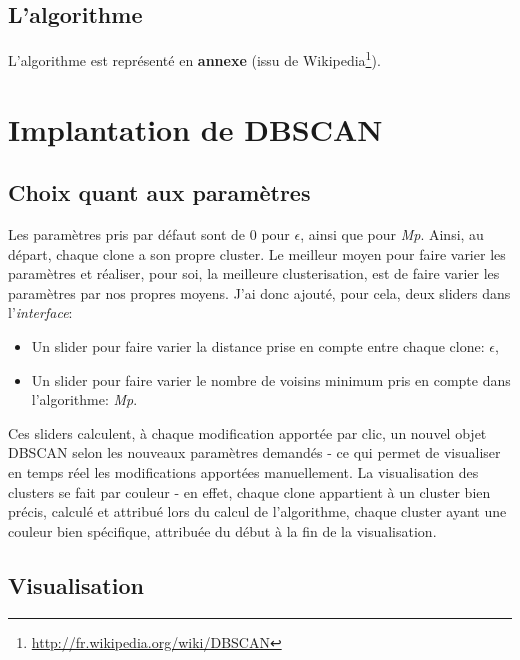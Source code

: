\documentclass[12pt]{report}
\begin{document}
\begin{spacing}{1.2}
\subsection{L'algorithme}

L'algorithme est représenté en \textbf{annexe} (issu de Wikipedia\footnote{\url{http://fr.wikipedia.org/wiki/DBSCAN}}).

\section{Implantation de DBSCAN}

\subsection{Choix quant aux paramètres}

Les paramètres pris par défaut sont de 0 pour $\epsilon$, ainsi que pour \textit{Mp}. Ainsi, au départ, chaque clone a son propre cluster.
\newline
Le meilleur moyen pour faire varier les paramètres et réaliser, pour soi, la meilleure clusterisation, est de faire varier les paramètres par nos propres moyens.
\newline
J'ai donc ajouté, pour cela, deux sliders dans l'\textit{interface}:
	\begin{itemize}
	\item{Un slider pour faire varier la distance prise en compte entre chaque clone: $\epsilon$},
	\item{Un slider pour faire varier le nombre de voisins minimum pris en compte dans l'algorithme: \textit{Mp}.}
	\end{itemize}
Ces sliders calculent, à chaque modification apportée par clic, un nouvel objet DBSCAN selon les nouveaux paramètres demandés - ce qui permet de visualiser en temps réel les modifications apportées manuellement.
\newline
La visualisation des clusters se fait par couleur - en effet, chaque clone appartient à un cluster bien précis, calculé et attribué lors du calcul de l'algorithme, chaque cluster ayant une couleur bien spécifique, attribuée du début à la fin de la visualisation.

\subsection{Visualisation}


\end{spacing}
\end{document}
